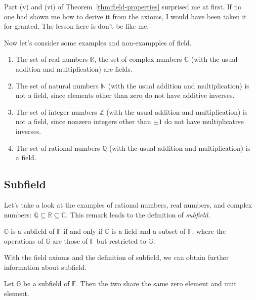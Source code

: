 \begin{note}
    Part (v) and (vi) of Theorem~\ref{thm:field-properties} surprised me at first. If no one had shown me how to derive it from the axioms, I would have been taken it for granted. The lesson here is don't be like me.
\end{note}

Now let's consider some examples and non-exampples of field.

\begin{example}
    \begin{enumerate}[label = (\alph*)]
        \item The set of real numbers $\mathbb{R}$, the set of complex numbers $\mathbb{C}$ (with the usual addition and multiplication) are fields.
        \item The set of natural numbers $\mathbb{N}$ (with the usual addition and multiplication) is not a field, since elements other than zero do not have additive inverses.
        \item The set of integer numbers $\mathbb{Z}$ (with the usual addition and multiplication) is not a field, since nonzero integers other than $\pm 1$ do not have multiplicative inverses.
        \item The set of rational numbers $\mathbb{Q}$ (with the usual addition and multiplication) is a field.
    \end{enumerate}
\end{example}

\subsection{Subfield}

Let's take a look at the examples of rational numbers, real numbers, and complex numbers: $\mathbb{Q}\subseteq\mathbb{R}\subseteq\mathbb{C}$. This remark leads to the definition of \textit{subfield}.

\begin{definition}[Subfield]
    $\mathbb{G}$ is a subfield of $\mathbb{F}$ if and only if $\mathbb{G}$ is a field and a subset of $\mathbb{F}$, where the operations of $\mathbb{G}$ are those of $\mathbb{F}$ but restricted to $\mathbb{G}$.
\end{definition}

With the field axioms and the definition of subfield, we can obtain further information about subfield.

\begin{theorem}
    Let $\mathbb{G}$ be a subfield of $\mathbb{F}$. Then the two share the same zero element and unit element.
\end{theorem}

